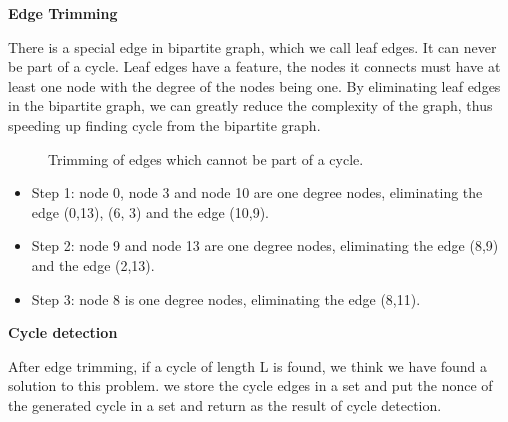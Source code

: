 \documentclass[a4paper,11pt]{article}
\begin{document}
\textbf{Edge Trimming}

There is a special edge in bipartite graph, which we call leaf edges. It can never be part of a cycle.
Leaf edges have a feature, the nodes it connects must have at least one node with the degree of the nodes being one.
By eliminating leaf edges in the bipartite graph, we can greatly reduce the complexity of the graph,
thus speeding up finding cycle from the bipartite graph.

\begin{figure}[ht]
	\centerline{%
	}
	\caption{Trimming of edges which cannot be part of a cycle.}
\end{figure}

\begin{itemize}
	\item Step 1: node 0, node 3 and node 10 are one degree nodes, eliminating the edge (0,13), (6, 3) and the edge (10,9).
	\item Step 2: node 9 and node 13 are one degree nodes, eliminating the edge (8,9) and the edge (2,13).
	\item Step 3: node 8 is one degree nodes, eliminating the edge (8,11).
\end{itemize}


\textbf{Cycle detection}

After edge trimming, if a cycle of length L is found, we think we have found a solution to this problem.
we store the cycle edges in a set and put the nonce of the generated cycle in a set and
return as the result of cycle detection.
\end{document}
